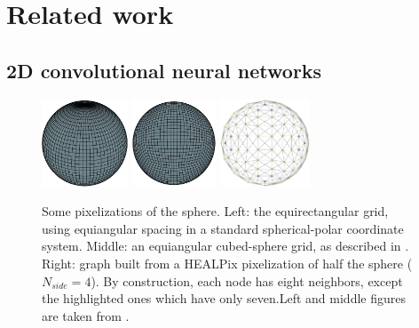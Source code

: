 \documentclass[final,twocolumn,3p,times,sort&compress]{elsarticle}
\newcommand{\1}{\b{1}}              %
\newcommand{\0}{\b{0}}              %
\begin{document}
\section{Related work}
\label{sec:related_work}

\subsection{2D convolutional neural networks}

\begin{figure}[t!]
    \centering
    \includegraphics[height=7em]{sphere_grid_equirectangular}
    \hfill
    \includegraphics[height=7em]{sphere_grid_cubedsphere}
    \hfill
    \includegraphics[height=7em]{half_graph_4}
    \caption[]{Some pixelizations of the sphere. Left: the equirectangular grid, using equiangular spacing in a standard spherical-polar coordinate system. Middle: an equiangular cubed-sphere grid, as described in \citep{ronchi1996cubed}. Right: graph built from a HEALPix pixelization of half the sphere ($N_{side} = 4$). By construction, each node has eight neighbors, except the highlighted ones which have only seven.\footnotemark[4] Left and middle figures are taken from \citep{boomsma2017spherical}.}
    \label{fig:sphere_grids}
    \label{fig:healpix_graph_4}
\end{figure}
\end{document}
